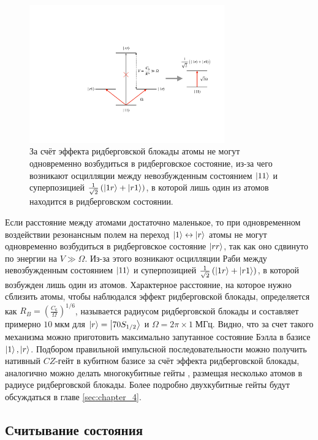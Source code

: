 \begin{figure}
	\centering
	\includegraphics[width=0.75\textwidth]{images/rydberg_blockade_scheme.pdf}
	\caption{За счёт эффекта ридберговской блокады атомы не могут одновременно возбудиться в ридберговское состояние, из-за чего возникают осцилляции между невозбужденным состоянием $\left| 11 \right\rangle$ и суперпозицией $\frac{1}{\sqrt{2}}\left(\left| 1r \right\rangle + \left| r1 \right\rangle\right)$, в которой лишь один из атомов находится в ридберговском состоянии.}
	\label{fig:rydberg_blockade}
\end{figure}

Если расстояние между атомами достаточно маленькое, то при одновременном воздействии резонансным полем на переход $\left| 1 \right\rangle\leftrightarrow\left| r \right\rangle$ атомы не могут одновременно возбудиться в ридберговское состояние $\left| rr \right\rangle$, так как оно сдвинуто по энергии на $V \gg \Omega$. Из-за этого возникают осцилляции Раби между невозбужденным состоянием $\left| 11 \right\rangle$ и суперпозицией $\frac{1}{\sqrt{2}}\left(\left| 1r \right\rangle + \left| r1 \right\rangle\right)$, в которой возбужден лишь один из атомов. Характерное расстояние, на которое нужно сблизить атомы, чтобы наблюдался эффект ридберговской блокады, определяется как $R_B = \left(\frac{C_6}{\Omega}\right)^{1/6}$, называется радиусом ридберговской блокады и составляет примерно $10 \;\text{мкм}$ для $\left| r \right\rangle=\left| 70 S_{1/2} \right\rangle$ и $\Omega = 2\pi \times 1 \;\text{МГц}$. Видно, что за счет такого механизма можно приготовить максимально запутанное состояние Бэлла в базисе $\left| 1 \right\rangle, \left| r \right\rangle$. Подбором правильной импульсной последовательности можно получить нативный $CZ$-гейт в кубитном базисе за счёт эффекта ридберговской блокады, аналогично можно делать многокубитные гейты \cite{toffoli}, размещая несколько атомов в радиусе ридберговской блокады. Более подробно двухкубитные гейты будут обсуждаться в главе \ref{sec:chapter_4}.

\subsection{Считывание состояния}


